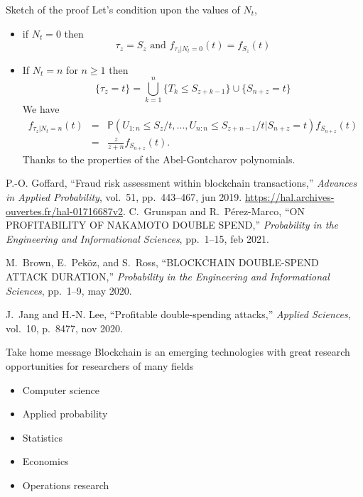 \documentclass{beamer}
\begin{document}
\begin{frame}{Sketch of the proof}
\scriptsize
Let's condition upon the values of $N_t$,
\begin{itemize}
  \item if $N_t=0$ then 
  $$\tau_z = S_z\text{ and }f_{\tau_z|N_t=0}(t) = f_{S_z}(t)$$
  \item If $N_t = n$ for $n\geq 1$ then 
  $$
  \{\tau_z = t\} = \bigcup_{k = 1}^n\{T_k\leq S_{z+k-1}\}\cup\{S_{n+z} = t\}
  $$
We have 
\begin{eqnarray*}
f_{\tau_z|N_t = n}(t) &=& \mathbb{P}(U_{1:n}\leq S_z/t,\ldots,U_{n:n}\leq S_{z+n-1}/t\Big\rvert S_{n+z}=t)f_{S_{n+z}}(t)\\
&=&\frac{z}{z+n}f_{S_{n+z}}(t).
\end{eqnarray*}
Thanks to the properties of the Abel-Gontcharov polynomials.
\end{itemize}
\tiny
\begin{thebibliography}{1}

P.-O. Goffard, ``Fraud risk assessment within blockchain transactions,'' {\em
  Advances in Applied Probability}, vol.~51, pp.~443--467, jun 2019.
\newblock \url{https://hal.archives-ouvertes.fr/hal-01716687v2}.
C.~Grunspan and R.~P{\'{e}}rez-Marco, ``{ON} {PROFITABILITY} {OF} {NAKAMOTO}
  {DOUBLE} {SPEND},'' {\em Probability in the Engineering and Informational
  Sciences}, pp.~1--15, feb 2021.

M.~Brown, E.~Peköz, and S.~Ross, ``{BLOCKCHAIN} {DOUBLE}-{SPEND} {ATTACK}
  {DURATION},'' {\em Probability in the Engineering and Informational
  Sciences}, pp.~1--9, may 2020.

J.~Jang and H.-N. Lee, ``Profitable double-spending attacks,'' {\em Applied
  Sciences}, vol.~10, p.~8477, nov 2020.

\end{thebibliography}
\end{frame}
\begin{frame}{Take home message}
Blockchain is an emerging technologies with great research opportunities for researchers of many fields
\begin{itemize}
  \item Computer science
  \item Applied probability
  \item Statistics
  \item Economics
  \item Operations research
\end{itemize}
\end{frame}
\end{document}
